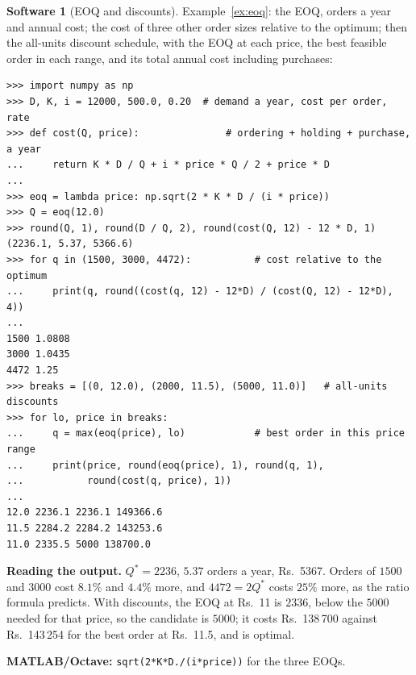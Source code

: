 \documentclass[11pt,a4paper]{article}
\numberwithin{equation}{section}
\theoremstyle{definition}
\newtheorem{software}[thm]{Software}
\begin{document}
\begin{software}[EOQ and discounts]
\label{sw:eoq}
Example~\ref{ex:eoq}: the EOQ, orders a year and annual cost; the cost of three other order sizes relative to the optimum; then the all-units discount schedule, with the EOQ at each price, the best feasible order in each range, and its total annual cost including purchases:
{\small\begin{verbatim}
>>> import numpy as np
>>> D, K, i = 12000, 500.0, 0.20  # demand a year, cost per order, rate
>>> def cost(Q, price):               # ordering + holding + purchase, a year
...     return K * D / Q + i * price * Q / 2 + price * D
...
>>> eoq = lambda price: np.sqrt(2 * K * D / (i * price))
>>> Q = eoq(12.0)
>>> round(Q, 1), round(D / Q, 2), round(cost(Q, 12) - 12 * D, 1)
(2236.1, 5.37, 5366.6)
>>> for q in (1500, 3000, 4472):           # cost relative to the optimum
...     print(q, round((cost(q, 12) - 12*D) / (cost(Q, 12) - 12*D), 4))
...
1500 1.0808
3000 1.0435
4472 1.25
>>> breaks = [(0, 12.0), (2000, 11.5), (5000, 11.0)]   # all-units discounts
>>> for lo, price in breaks:
...     q = max(eoq(price), lo)            # best order in this price range
...     print(price, round(eoq(price), 1), round(q, 1),
...           round(cost(q, price), 1))
...
12.0 2236.1 2236.1 149366.6
11.5 2284.2 2284.2 143253.6
11.0 2335.5 5000 138700.0
\end{verbatim}}
\textbf{Reading the output.} $Q^* = 2236$, $5.37$ orders a year, Rs.~5367. Orders of $1500$ and $3000$ cost $8.1\%$ and $4.4\%$ more, and $4472 = 2Q^*$ costs $25\%$ more, as the ratio formula predicts. With discounts, the EOQ at Rs.~11 is $2336$, below the $5000$ needed for that price, so the candidate is $5000$; it costs Rs.~138\,700
against Rs.~143\,254 for the best order at Rs.~11.5, and is optimal.

\textbf{MATLAB/Octave:} \texttt{sqrt(2*K*D./(i*price))} for the three EOQs.
\end{software}
\end{document}
